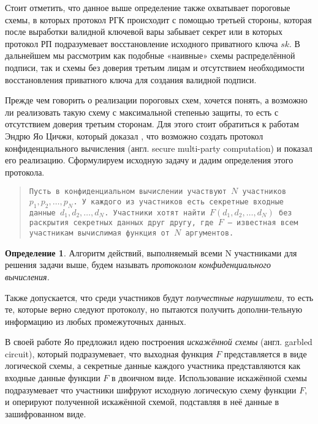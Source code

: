 \documentclass[a4paper,12pt]{article}
\theoremstyle{definition}
\newtheorem{defn}{Определение}
\begin{document}
	Стоит отметить, что данное выше определение также охватывает пороговые схемы, в которых протокол РГК происходит с помощью третьей стороны, которая после выработки валидной ключевой вары забывает секрет или в которых протокол РП подразумевает восстановление исходного приватного ключа $sk$. В дальнейшем мы рассмотрим как подобные «наивные» схемы распределённой подписи, так и схемы без доверия третьим лицам и отсутствием необходимости восстановления приватного ключа для создания валидной подписи.
	
	Прежде чем говорить о реализации пороговых схем, хочется понять, а возможно ли реализовать такую схему с максимальной степенью защиты, то есть с отсутствием доверия третьим сторонам. Для этого стоит обратиться к работам Эндрю Яо Цичжи, который доказал \cite{paper2}, что возможно создать протокол конфиденциального вычисления (англ. secure multi-party computation) и показал его реализацию. Сформулируем исходную задачу и дадим определения этого протокола.

	\begin{quote}
	\texttt{Пусть в конфиденциальном вычислении участвуют $N$ участников $p_1, p_2, \dots, p_N$. У каждого из участников есть секретные входные данные $d_1, d_2, \dots, d_N$. Участники хотят найти $F(d_1, d_2, \dots, d_N)$  без раскрытия секретных данных друг другу, где $F$ – известная всем участникам вычислимая функция от $N$ аргументов. }
	\end{quote}

	\begin{defn}\label{def:Tconf}	
	Алгоритм действий, выполняемый всеми N участниками для решения задачи выше, будем называть \textit{протоколом конфиденциального вычисления.}
	\end{defn}
	
	Также допускается, что среди участников будут \textit{получестные нарушители}, то есть те, которые верно следуют протоколу, но пытаются получить дополни-тельную информацию из любых промежуточных данных.
	
	В своей работе Яо предложил идею построения \textit{искажённой схемы} (англ. garbled circuit), который подразумевает, что выходная функция $F$ представляется в виде логической схемы, а секретные данные каждого участника представляются как входные данные функции $F$ в двоичном виде. Использование искажённой схемы подразумевает что участники шифруют исходную логическую схему функции $F$, и оперируют полученной искажённой схемой, подставляя в неё данные в зашифрованном виде. 
	
\end{document}
